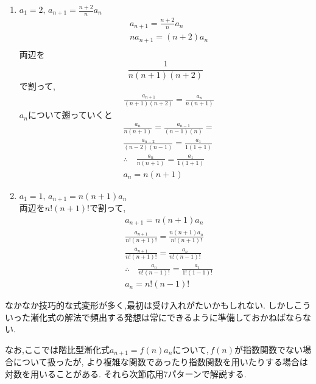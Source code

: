 \begin{enumerate}[label=(\arabic*),parsep=3pt]
        \item $\displaystyle a_1=2,\, a_{n+1}=\frac{n+2}{n}a_n$
              \begin{align*}
                &a_{n+1}=\frac{n+2}{n}a_n\\
                &na_{n+1}=(n+2)a_n\\
              \end{align*}
              両辺を
              \[
                \displaystyle \frac{1}{n(n+1)(n+2)}
              \]
              で割って,
              \begin{align*}        
                &\frac{a_{n+1}}{(n+1)(n+2)}=\frac{a_{n}}{n(n+1)}
              \end{align*}
              $a_n$について遡っていくと
              \begin{align*}
                &\frac{a_{n}}{n(n+1)}=\frac{a_{n-1}}{(n-1)(n)}=\\
                &\frac{a_{n-2}}{(n-2)(n-1)}=\frac{a_{1}}{1(1+1)}\\
                &\therefore \quad \frac{a_{n}}{n(n+1)}=\frac{a_{1}}{1(1+1)}\\
                &a_n=n(n+1)
              \end{align*}
        \item $\displaystyle a_1=1,\, a_{n+1}=n(n+1)a_n$\\
                両辺を$n!(n+1)!$で割って,
              \begin{align*}
                &a_{n+1}=n(n+1)a_n\\
                &\frac{a_{n+1}}{n!(n+1)!}=\frac{n(n+1)a_n}{n!(n+1)!}\\
                &\frac{a_{n+1}}{n!(n+1)!}=\frac{a_n}{n!(n-1)!}\\
                &\therefore \quad \frac{a_n}{n!(n-1)!}=\frac{a_1}{1!(1-1)!}\\
                &a_n=n!(n-1)!
              \end{align*}
      \end{enumerate}

      なかなか技巧的な式変形が多く,最初は受け入れがたいかもしれない.
      しかしこういった漸化式の解法で頻出する発想は常にできるように準備しておかねばならない.

      なお,ここでは階比型漸化式$a_{n+1}=f(n)a_n$について,\,$f(n)$が指数関数でない場合について扱ったが,
      より複雑な関数であったり指数関数を用いたりする場合は対数を用いることがある.
      それら次節応用7パターンで解説する.
      
